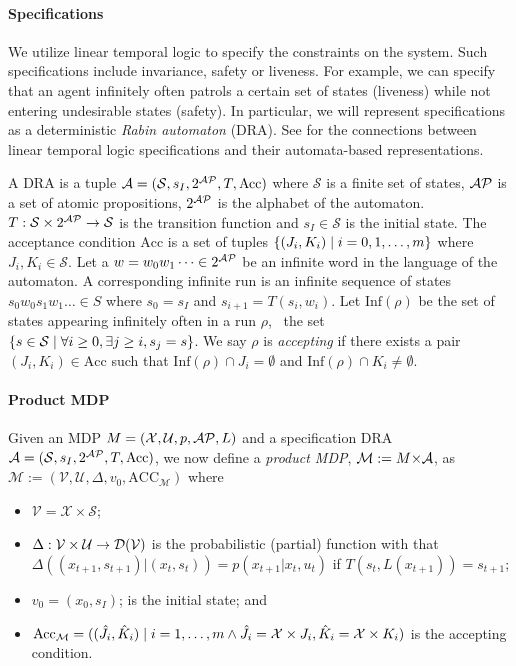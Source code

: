 
\paragraph*{Specifications} We utilize linear temporal logic to specify the constraints on the system. Such specifications include invariance, safety or liveness. For example, we can specify that an agent infinitely often patrols a certain set of states (liveness) while not entering undesirable states (safety).  In particular, we will represent specifications as a deterministic \emph{Rabin automaton} (DRA). See \cite{BaierKatoen08,safra1988complexity} for the connections between linear temporal logic specifications and their automata-based representations.

A DRA is a tuple $\mathcal{A} = (\mathcal{S},s_I,2^{\mathcal{AP}}, T,\textrm{Acc})$ where $\mathcal{S}$ is a finite set of states, $\mathcal{AP}$ is a set of atomic propositions, $2^{\mathcal{AP}}$ is the alphabet of the automaton. $T: \mathcal{S} \times 2^{\mathcal{AP}} \rightarrow \mathcal{S} $ is the transition function and $s_I \in \mathcal{S}$ is the initial state. The acceptance condition $\textrm{Acc}$ is a set of tuples $\{(J_i,K_i) \mathrel{\mid} i= 0,1,\dots,m \}$ where $J_i,K_i \in \mathcal{S}$. Let a $w = w_0 w_1 \dots \in 2^{\mathcal{AP}}$ be an infinite word in the language of the automaton. A corresponding infinite run is an infinite sequence of states $s_0 w_0 s_1 w_1 \dots \in S$ where $s_0 = s_I$ and $s_{i+1} = T(s_i,w_i)$. Let $\textrm{Inf}(\rho)$ be the set of states appearing infinitely often in a run $\rho$, \ie~the set $\{s \in \mathcal{S} \mathrel{\mid} \forall i \ge 0, \exists j \ge i, s_j = s\}$. We say $\rho$ is \emph{accepting} if there exists a pair $(J_i,K_i) \in \textrm{Acc}$ such that $\textrm{Inf}(\rho) \cap J_i = \emptyset$ and $\textrm{Inf}(\rho) \cap K_i \neq \emptyset$.

\paragraph*{Product MDP}
Given an MDP $M=(\mathcal{X},\mathcal{U},p,\mathcal{AP},L)$ and a specification DRA
$\mathcal{A} = (\mathcal{S},s_I,2^{\mathcal{AP}}, T,\textrm{Acc})$, we now define a \emph{product
MDP}, $\mathcal{M} := M \mathcal{\times A}$, as $\mathcal{M}
:= (\mathcal{V},\mathcal{U}, \Delta,v_0,\textrm{ACC}_{\mathcal{M}})$ where
\begin{itemize}
	\item $\mathcal{V} = \mathcal{X} \times \mathcal{S}$;
	\item $\Delta: \mathcal{V} \times \mathcal{U} \rightarrow \mathcal{D}(\mathcal{V})$ is the probabilistic
		(partial) function with
		that $\Delta\left((x_{t+1},s_{t+1})\vert (x_t,s_t)\right) = p(x_{t+1} \vert x_t,u_t ) $ if $T(s_t,L(x_{t+1}))
		= s_{t+1}$;
	\item $v_0 = (x_0,s_I)$; is the initial state; and
	\item $\textrm{Acc}_{\mathcal{M}} =
		((\hat{J}_i,\hat{K}_i) \mathrel{\mid} i = 1,\dots,m \land \hat{J}_i = \mathcal{X}
		\times J_i,\hat{K}_i = \mathcal{X} \times K_i)$ is the accepting condition.
\end{itemize}

